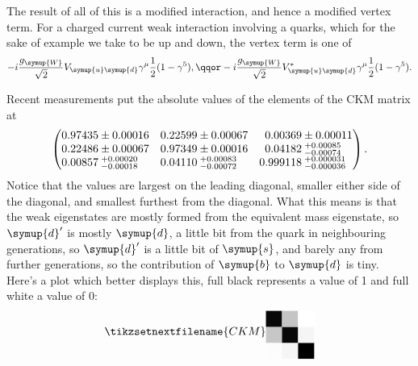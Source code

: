 \documentclass[fleqn]{NotesClass}
\newcommand{\Pparticle}[1]{\symup{#1}}
\newcommand{\Pu}{\ensuremath{\Pparticle{u}}}
\newcommand{\Pd}{\ensuremath{\Pparticle{d}}}
\newcommand{\Ps}{\ensuremath{\Pparticle{s}}}
\newcommand{\Pb}{\ensuremath{\Pparticle{b}}}
\newcommand{\PW}{\ensuremath{\Pparticle{W}}}
\begin{document}
    The result of all of this is a modified interaction, and hence a modified vertex term.
    For a charged current weak interaction involving a quarks, which for the sake of example we take to be up and down, the vertex term is one of
    \begin{equation}
        -i \frac{g_{\PW}}{\sqrt{2}} V_{\Pu\Pd} \gamma^\mu \frac{1}{2}(1 - \gamma^5), \qqor -i\frac{g_{\PW}}{\sqrt{2}} V_{\Pu\Pd}^* \gamma^\mu \frac{1}{2}(1 - \gamma^5).
    \end{equation}
    
    Recent measurements put the absolute values of the elements of the CKM matrix at
    \begingroup
    \def\arraystretch{1.4}
    \begin{equation}
        \left(
        \begin{array}{@{}r@{}lr@{}lr@{}l@{}}
            0.97435 & {} \pm 0.00016 & 0.22599 & {} \pm 0.00067 & 0.00369 & {} \pm 0.00011\\
            0.22486 & {} \pm 0.00067 & 0.97349 & {} \pm 0.00016 & 0.04182 & {} \mathbin{\substack{+0.00085\\ -0.00074}} {}\\
            0.00857 & {} \mathbin{\substack{+0.00020\\ -0.00018}} {} & 0.04110 & {} \mathbin{\substack{+0.00083\\ -0.00072}} {} &  0.999118 & {}  \mathbin{\substack{+ 0.000031\\ - 0.000036}} {}
        \end{array}
        \right)
        .
    \end{equation}
    \endgroup
    Notice that the values are largest on the leading diagonal, smaller either side of the diagonal, and smallest furthest from the diagonal.
    What this means is that the weak eigenstates are mostly formed from the equivalent mass eigenstate, so \(\Pd'\) is mostly \(\Pd\), a little bit from the quark in neighbouring generations, so \(\Pd'\) is a little bit of \(\Ps\), and barely any from further generations, so the contribution of \(\Pb\) to \(\Pd\) is tiny.
    Here's a plot which better displays this, full black represents a value of 1 and full white a value of 0:
    \begin{equation}
        \tikzsetnextfilename{CKM}
        \begin{tikzpicture}[baseline=(current bounding box)]
            \fill[black!1!white] (0, 0) rectangle (0.5, 0.5);
            \fill[black!4!white] (0.5, 0) rectangle (1, 0.5);
            \fill[black!100!white] (1, 0) rectangle (1.5, 0.5);
            \fill[black!22!white] (0, 0.5) rectangle (0.5, 1);
            \fill[black!97!white] (0.5, 0.5) rectangle (1, 1);
            \fill[black!4!white] (1, 0.5) rectangle (1.5, 1);
            \fill[black!97!white] (0, 1) rectangle (0.5, 1.5);
            \fill[black!23!white] (0.5, 1) rectangle (1, 1.5);
            \fill[black!0!white] (1, 1) rectangle (1.5, 1.5);
        \end{tikzpicture}
    \end{equation}
    
\end{document}
